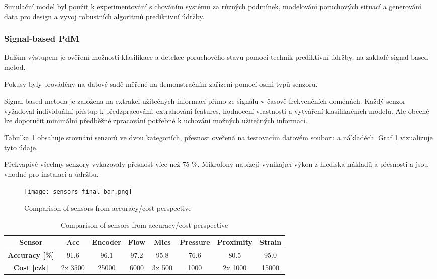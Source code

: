 Simulační model byl použit k experimentování s chováním systému za různých
podmínek, modelování poruchových situací a generování data pro design
a vyvoj robustních algoritmů prediktivní údržby.


\subsubsection{Signal-based PdM}
Dalším výstupem je ověření možnosti klasifikace a
detekce poruchového stavu pomocí technik prediktivní údržby,
na zakladé signal-based  metod. 

Pokusy byly prováděny na datové sadě měřené na demonstračním
zařízení pomocí osmi typů senzorů.
  
Signal-based metoda je založena na extrakci užitečných informací
přímo ze signálu v časově-frekvenčních doménách. Každý senzor vyžadoval
individuální přístup k předzpracování, extrahování features, hodnocení
vlastnosti a vytváření klasifikačních modelů. Ale obecně lze doporučit
minimální předběžné zpracování potřebné k uchování možných užitečných informací.

Tabulka \ref{tab:sensors_final} obsahuje srovnání senzorů ve dvou 
kategoriích, přesnost oveřená na testovacím datovém souboru a nákladéch.
Graf \ref{fig:sensors_final_bar} vizualizuje tyto údaje.

Překvapivě všechny senzory vykazovaly přesnost více než 75 \%. Mikrofony
nabízejí vynikající výkon z hlediska nákladů a přesnosti a jsou
vhodné pro instalaci a údržbu.

\begin{figure}[h!]
    \centering
    \texttt{[image: sensors\_final\_bar.png]}
    \caption{Comparison of sensors from accuracy/cost perspective}
    \label{fig:sensors_final_bar}
\end{figure}

\begin{table}[h]
    \centering
    \begin{tabular}{|c|c|c|c|c|c|c|c|}
        \hline
        \textbf{Sensor}   & Acc & Encoder & Flow & Mics & Pressure & Proximity & Strain \\
        \hline
        \textbf{Accuracy [\%]} & 91.6 & 96.1 & 97.2 & 95.8 & 76.6 & 80.5 & 95.0 \\
        \hline
        \textbf{Cost [czk]} & 2x 3500 & 25000 & 6000 & 3x 500 & 1000 & 2x 1000 & 15000 \\
        \hline
    \end{tabular}
    \caption{Comparison of sensors from accuracy/cost perspective}
    \label{tab:sensors_final}
\end{table}

